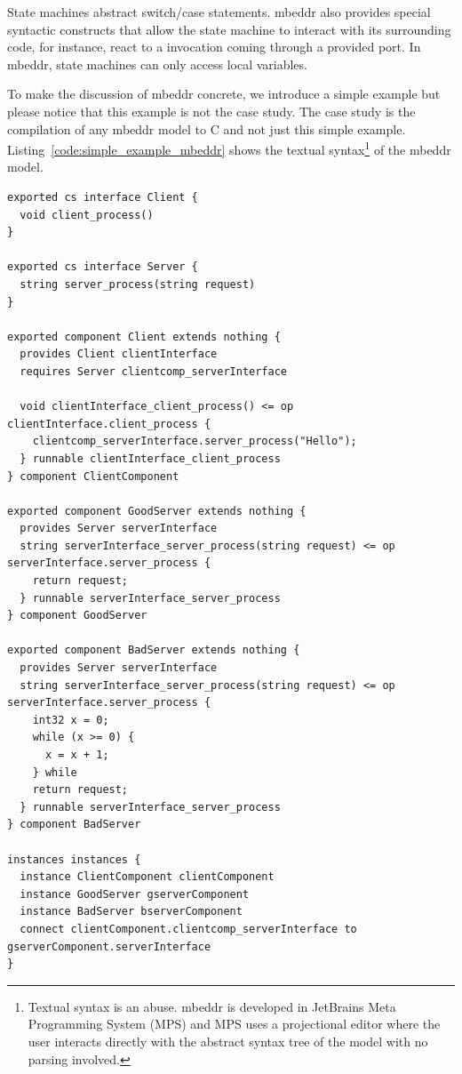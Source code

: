 State machines abstract switch/case statements. mbeddr also provides special syntactic constructs that allow the state machine to interact with its surrounding code, for instance, react to a invocation coming through a provided port. In mbeddr, state machines can only access local variables.

To make the discussion of mbeddr concrete, we introduce a simple example but please notice that this example is not the case study. The case study is the compilation of any mbeddr model to C and not just this simple example.
Listing~\ref{code:simple_example_mbeddr} shows the textual syntax\footnote{Textual syntax is an abuse. mbeddr is developed in JetBrains Meta Programming System (MPS) and MPS uses a projectional editor where the user interacts directly with the abstract syntax tree of the model with no parsing involved.} of the mbeddr model.


\begin{lstlisting}[float]
exported cs interface Client { 
  void client_process() 
} 

exported cs interface Server { 
  string server_process(string request) 
} 

exported component Client extends nothing { 
  provides Client clientInterface 
  requires Server clientcomp_serverInterface 
   
  void clientInterface_client_process() <= op clientInterface.client_process { 
    clientcomp_serverInterface.server_process("Hello"); 
  } runnable clientInterface_client_process 
} component ClientComponent 

exported component GoodServer extends nothing { 
  provides Server serverInterface 
  string serverInterface_server_process(string request) <= op serverInterface.server_process { 
    return request; 
  } runnable serverInterface_server_process 
} component GoodServer 

exported component BadServer extends nothing { 
  provides Server serverInterface 
  string serverInterface_server_process(string request) <= op serverInterface.server_process { 
    int32 x = 0; 
    while (x >= 0) { 
      x = x + 1; 
    } while 
    return request; 
  } runnable serverInterface_server_process 
} component BadServer 

instances instances { 
  instance ClientComponent clientComponent 
  instance GoodServer gserverComponent 
  instance BadServer bserverComponent 
  connect clientComponent.clientcomp_serverInterface to gserverComponent.serverInterface
}
\end{lstlisting}

